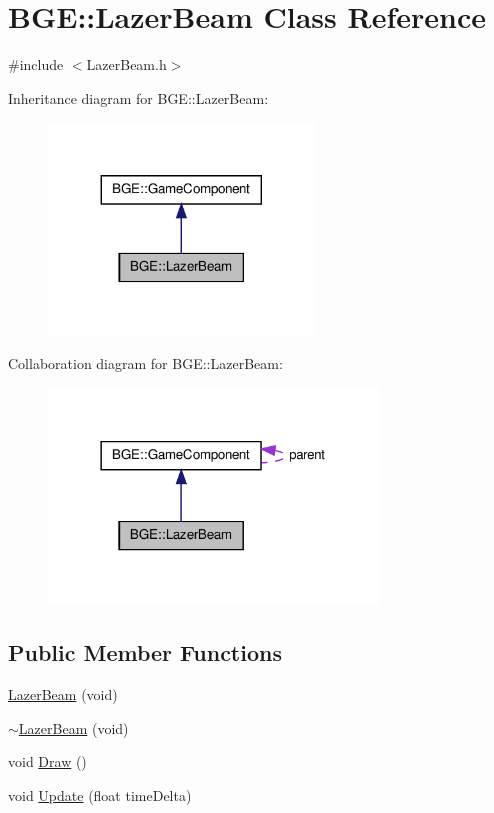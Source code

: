 \hypertarget{class_b_g_e_1_1_lazer_beam}{\section{B\-G\-E\-:\-:Lazer\-Beam Class Reference}
\label{class_b_g_e_1_1_lazer_beam}
}


{\ttfamily \#include $<$Lazer\-Beam.\-h$>$}



Inheritance diagram for B\-G\-E\-:\-:Lazer\-Beam\-:
\nopagebreak
\begin{figure}[H]
\begin{center}
\leavevmode
\includegraphics[width=200pt]{class_b_g_e_1_1_lazer_beam__inherit__graph}
\end{center}
\end{figure}


Collaboration diagram for B\-G\-E\-:\-:Lazer\-Beam\-:
\nopagebreak
\begin{figure}[H]
\begin{center}
\leavevmode
\includegraphics[width=249pt]{class_b_g_e_1_1_lazer_beam__coll__graph}
\end{center}
\end{figure}
\subsection*{Public Member Functions}
\begin{DoxyCompactItemize}
\item 
\hyperlink{class_b_g_e_1_1_lazer_beam_a16321e7422ebc7eb949619df280489ff}{Lazer\-Beam} (void)
\item 
\hyperlink{class_b_g_e_1_1_lazer_beam_af1fc667c9c2744a48bb46a7acfba78ce}{$\sim$\-Lazer\-Beam} (void)
\item 
void \hyperlink{class_b_g_e_1_1_lazer_beam_a15d17a33090a828077d962c6262e5d84}{Draw} ()
\item 
void \hyperlink{class_b_g_e_1_1_lazer_beam_a280ca92b029910b173298534d22075d8}{Update} (float time\-Delta)
\end{DoxyCompactItemize}
